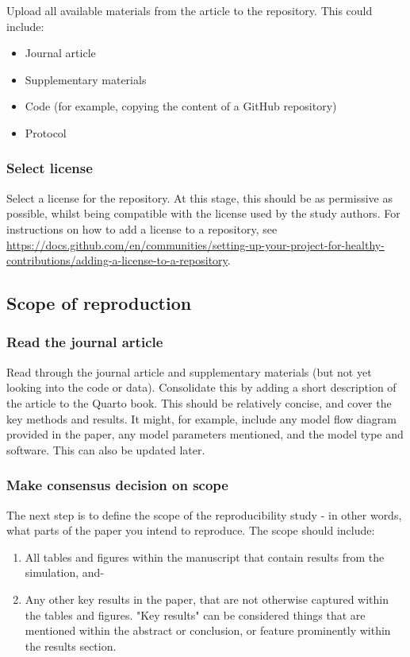Upload all available materials from the article to the repository. This could include:
\begin{itemize}
    \item Journal article
    \item Supplementary materials
    \item Code (for example, copying the content of a GitHub repository)
    \item Protocol
\end{itemize}

\subsubsection{Select license}
\timeyes

Select a license for the repository. At this stage, this should be as permissive as possible, whilst being compatible with the license used by the study authors. For instructions on how to add a license to a repository, see \url{https://docs.github.com/en/communities/setting-up-your-project-for-healthy-contributions/adding-a-license-to-a-repository}.

\subsection{Scope of reproduction}

\subsubsection{Read the journal article}
\timeyes

Read through the journal article and supplementary materials (but not yet looking into the code or data). Consolidate this by adding a short description of the article to the Quarto book. This should be relatively concise, and cover the key methods and results. It might, for example, include any model flow diagram provided in the paper, any model parameters mentioned, and the model type and software. This can also be updated later.

\subsubsection{Make consensus decision on scope}

The next step is to define the scope of the reproducibility study - in other words, what parts of the paper you intend to reproduce. The scope should include:
\begin{enumerate}[label=(\alph*)]
    \item All tables and figures within the manuscript that contain results from the simulation, and-
    \item Any other key results in the paper, that are not otherwise captured within the tables and figures. "Key results" can be considered things that are mentioned within the abstract or conclusion, or feature prominently within the results section.
\end{enumerate}

